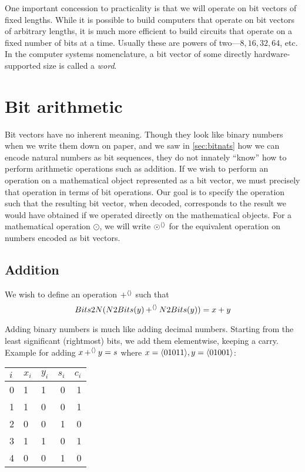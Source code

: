 One important concession to practicality is that we will operate on
bit vectors of fixed lengths.  While it is possible to build computers
that operate on bit vectors of arbitrary lengths, it is much more
efficient to build circuits that operate on a fixed number of bits at
a time.  Usually these are powers of two---$8,16,32,64$, etc.  In the
computer systems nomenclature, a bit vector of some directly
hardware-supported size is called a \emph{word}.

\section{Bit arithmetic}
\label{sec:bit-arithmetic}

Bit vectors have no inherent meaning.  Though they look like binary
numbers when we write them down on paper, and we saw in
\cref{sec:bitnats} how we can encode natural numbers as bit sequences,
they do not innately ``know'' how to perform arithmetic operations
such as addition.  If we wish to perform an operation on a
mathematical object represented as a bit vector, we must precisely
that operation in terms of bit operations.  Our goal is to specify the
operation such that the resulting bit vector, when decoded,
corresponds to the result we would have obtained if we operated
directly on the mathematical objects.  For a mathematical operation
$\odot$, we will write $\operatorname{\odot^{\langle\rangle}}$ for the equivalent operation on
numbers encoded as bit vectors.

\subsection{Addition}
\label{sec:bit-addition}

We wish to define an operation $\operatorname{+^{\langle\rangle}}$ such that
\begin{equation}
  Bits2N(N2Bits(y)\operatorname{+^{\langle\rangle}}{}N2Bits(y)) = x + y
\end{equation}

Adding binary numbers is much like adding decimal numbers.  Starting
from the least significant (rightmost) bits, we add them elementwise,
keeping a carry.  Example for adding $x\operatorname{+^{\langle\rangle}}{} y=s$ where
$x=\langle 01011 \rangle, y=\langle 01001 \rangle$:

\begin{center}
\begin{tabular}{l|llrr}
  $i$ & $x_{i}$ & $y_{i}$ & $s_{i}$ & $c_{i}$ \\\hline
  0 & 1 & 1 & 0 & 1 \\
  1 & 1 & 0 & 0 & 1 \\
  2 & 0 & 0 & 1 & 0 \\
  3 & 1 & 1 & 0 & 1 \\
  4 & 0 & 0 & 1 & 0
\end{tabular}
\end{center}

